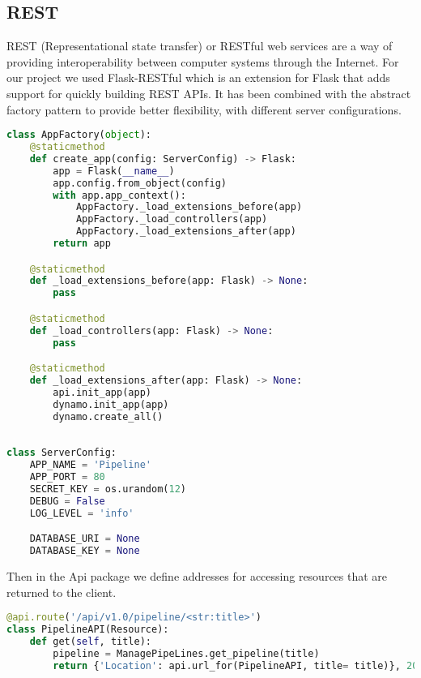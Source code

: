 \subsection{REST}
REST (Representational state transfer) or RESTful web services are a way of providing interoperability between computer systems through the Internet. For our project we used Flask-RESTful which is an extension for Flask that adds support for quickly building REST APIs. It has been combined with the abstract factory pattern to provide better flexibility, with different server configurations.

\begin{lstlisting}[language=Python]
class AppFactory(object):
    @staticmethod
    def create_app(config: ServerConfig) -> Flask:
        app = Flask(__name__)
        app.config.from_object(config)
        with app.app_context():
            AppFactory._load_extensions_before(app)
            AppFactory._load_controllers(app)
            AppFactory._load_extensions_after(app)
        return app

    @staticmethod
    def _load_extensions_before(app: Flask) -> None:
        pass

    @staticmethod
    def _load_controllers(app: Flask) -> None:
        pass

    @staticmethod
    def _load_extensions_after(app: Flask) -> None:
        api.init_app(app)
        dynamo.init_app(app)
        dynamo.create_all()
        
        
class ServerConfig:
    APP_NAME = 'Pipeline'
    APP_PORT = 80
    SECRET_KEY = os.urandom(12)
    DEBUG = False
    LOG_LEVEL = 'info'

    DATABASE_URI = None
    DATABASE_KEY = None
\end{lstlisting}

Then in the Api package we define addresses for accessing resources that are returned to the client.

\begin{lstlisting}[language=Python]
@api.route('/api/v1.0/pipeline/<str:title>')
class PipelineAPI(Resource):
    def get(self, title):
        pipeline = ManagePipeLines.get_pipeline(title)
        return {'Location': api.url_for(PipelineAPI, title= title)}, 201
\end{lstlisting}
